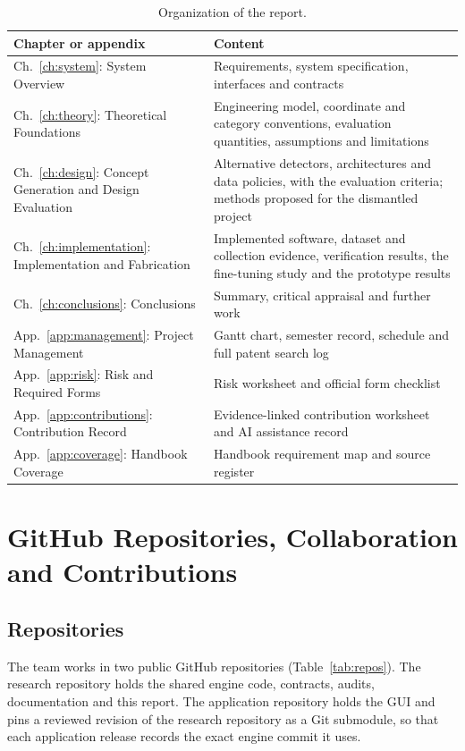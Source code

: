 \begin{table}[htbp]
\centering\tablesetup
\caption{Organization of the report.}
\label{tab:organization}
\begin{tabularx}{\textwidth}{@{}L{0.36\textwidth}Y@{}}
\toprule
Chapter or appendix & Content\\
\midrule
Ch.~\ref{ch:system}: System Overview & Requirements, system specification,
interfaces and contracts\\
Ch.~\ref{ch:theory}: Theoretical Foundations & Engineering model, coordinate and
category conventions, evaluation quantities, assumptions and limitations\\
Ch.~\ref{ch:design}: Concept Generation and Design Evaluation & Alternative
detectors, architectures and data policies, with the evaluation criteria; methods
proposed for the dismantled project\\
Ch.~\ref{ch:implementation}: Implementation and Fabrication & Implemented
software, dataset and collection evidence, verification results, the
fine-tuning study and the prototype results\\
Ch.~\ref{ch:conclusions}: Conclusions & Summary, critical appraisal and further
work\\
App.~\ref{app:management}: Project Management & Gantt chart, semester record,
schedule and full patent search log\\
App.~\ref{app:risk}: Risk and Required Forms & Risk worksheet and official form
checklist\\
App.~\ref{app:contributions}: Contribution Record & Evidence-linked contribution
worksheet and AI assistance record\\
App.~\ref{app:coverage}: Handbook Coverage & Handbook requirement map and source
register\\
\bottomrule
\end{tabularx}
\end{table}

\section{GitHub Repositories, Collaboration and Contributions}
\label{sec:github}

\subsection{Repositories}
The team works in two public GitHub repositories (Table~\ref{tab:repos}). The research repository holds
the shared engine code, contracts, audits, documentation and this report. The
application repository holds the GUI and pins a reviewed revision of the research
repository as a Git submodule, so that each application release records the exact
engine commit it uses.

